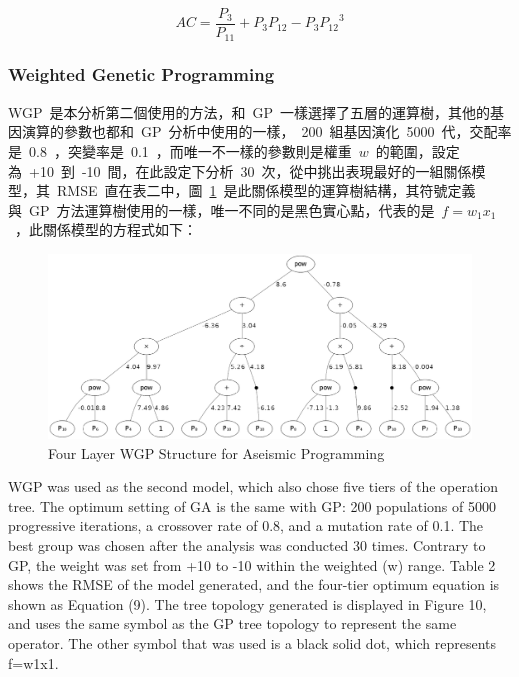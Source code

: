 \begin{equation} AC = \dfrac{P_3}{P_{11}} + P_3 P_{12} - P_3 {P_{12}}^3  \label{eq:GP_AC}\end{equation}

\subsubsection{Weighted Genetic Programming}

WGP~是本分析第二個使用的方法，和~GP~一樣選擇了五層的運算樹，其他的基因演算的參數也都和~GP~分析中使用的一樣，~200~組基因演化~5000~代，交配率是~0.8~，突變率是~0.1~，而唯一不一樣的參數則是權重~$w$~的範圍，設定為~+10~到~-10~間，在此設定下分析~30~次，從中挑出表現最好的一組關係模型，其~RMSE~直在表二中，圖~\ref{fig:4LWGP}~是此關係模型的運算樹結構，其符號定義與~GP~方法運算樹使用的一樣，唯一不同的是黑色實心點，代表的是~$f = w_1x_1$~，此關係模型的方程式如下：

\begin{figure}[hbtp]
  \begin{center}
    \includegraphics[width=1.0\textwidth]{figures/4-layer-wgp.png}
    \caption{Four Layer WGP Structure for Aseismic Programming} 
    \label{fig:4LWGP}
  \end{center}
\end{figure}


WGP was used as the second model, which also chose five tiers of the operation tree. The optimum setting of GA is the same with GP: 200 populations of 5000 progressive iterations, a crossover rate of 0.8, and a mutation rate of 0.1. The best group was chosen after the analysis was conducted 30 times. Contrary to GP, the weight was set from +10 to -10 within the weighted (w) range. Table 2 shows the RMSE of the model generated, and the four-tier optimum equation is shown as Equation (9). The tree topology generated is displayed in Figure 10, and uses the same symbol as the GP tree topology to represent the same operator. The other symbol that was used is a black solid dot, which represents f=w1x1.

